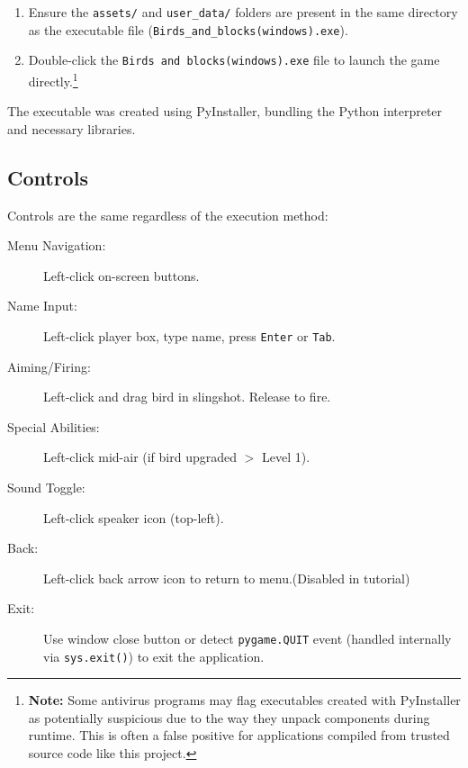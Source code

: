\documentclass[11pt, a4paper]{article}
\begin{document}
\begin{enumerate}

    \item Ensure the \texttt{assets/} and \texttt{user\_data/} folders are present in the same directory as the executable file (\texttt{Birds\_and\_blocks(windows).exe}).
    
    \item Double-click the \texttt{Birds and blocks(windows).exe} file to launch the game directly.\footnote{\textbf{Note:} Some antivirus programs may flag executables created with PyInstaller as potentially suspicious due to the way they unpack components during runtime. This is often a false positive for applications compiled from trusted source code like this project.}

\end{enumerate}

The executable was created using PyInstaller, bundling the Python interpreter and necessary libraries.

\subsection{Controls}
\label{sec:controls}

Controls are the same regardless of the execution method:

\begin{description}

    \item[Menu Navigation:] Left-click on-screen buttons.
    
    \item[Name Input:] Left-click player box, type name, press \texttt{Enter} or \texttt{Tab}.
    
    \item[Aiming/Firing:] Left-click and drag bird in slingshot. Release to fire.
    
    \item[Special Abilities:] Left-click mid-air (if bird upgraded $>$ Level 1).
    
    \item[Sound Toggle:] Left-click speaker icon (top-left).
    
    \item[Back:] Left-click back arrow icon to return to menu.(Disabled in tutorial)
    
    \item[Exit:] Use window close button or detect \texttt{pygame.QUIT} event (handled internally via \texttt{sys.exit()}) to exit the application.

\end{description}
\end{document}
